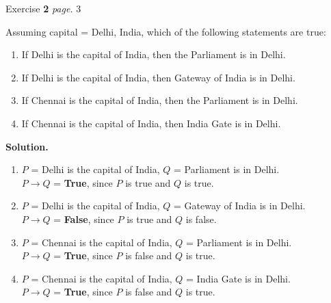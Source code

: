 \documentclass[11pt]{article}
\newcommand{\problem
}[2]{
\begin{mdframed}
    Exercise \textbf{#1} \hfill \emph{page. }#2
\end{mdframed}
}
\begin{document}
\problem{2}{3}
Assuming capital = Delhi, India, which of the following statements are true:
\begin{enumerate}
	\item If Delhi is the capital of India, then the Parliament is in Delhi.
	\item If Delhi is the capital of India, then Gateway of India is in Delhi.
	\item If Chennai is the capital of India, then the Parliament is in Delhi.
	\item If Chennai is the capital of India, then India Gate is in Delhi.
\end{enumerate}
\textbf{Solution. }
\begin{enumerate}
	\item $P$ = Delhi is the capital of India, $Q$ = Parliament is in Delhi. \\
	      $P \rightarrow Q$ = \textbf{True}, since $P$ is true and $Q$ is true.
	\item $P$ = Delhi is the capital of India, $Q$ = Gateway of India is in Delhi. \\
	      $P \rightarrow Q$ = \textbf{False}, since $P$ is true and $Q$ is false.
	\item $P$ = Chennai is the capital of India, $Q$ = Parliament is in Delhi. \\
	      $P \rightarrow Q$ = \textbf{True}, since $P$ is false and $Q$ is true.
	\item $P$ = Chennai is the capital of India, $Q$ = India Gate is in Delhi. \\
	      $P \rightarrow Q$ = \textbf{True}, since $P$ is false and $Q$ is true.
\end{enumerate}
\end{document}
